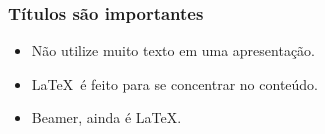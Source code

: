 \documentclass[aspectratio=169,14pt]{beamer}
\begin{document}
\begin{frame}
    \frametitle{Títulos são importantes}
    \begin{itemize}
        \item{Não utilize muito texto em uma apresentação.}
        \item{\LaTeX\ é feito para se concentrar no conteúdo.}
        \item{Beamer, ainda é \LaTeX.}
    \end{itemize}
        
\end{frame}

{%
    \begin{frame}
    \end{frame}
}
\end{document}
